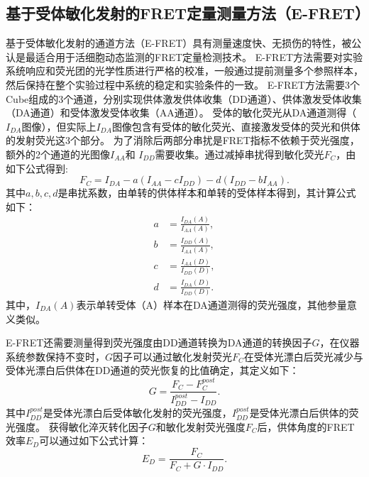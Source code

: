 \subsection{基于受体敏化发射的FRET定量测量方法（E-FRET）}

\ifshowtext
基于受体敏化发射的通道方法（E-FRET）具有测量速度快、无损伤的特性，被公认是最适合用于活细胞动态监测的FRET定量检测技术。
E-FRET方法需要对实验系统响应和荧光团的光学性质进行严格的校准，一般通过提前测量多个参照样本，然后保持在整个实验过程中系统的稳定和实验条件的一致。
E-FRET方法需要3个Cube组成的3个通道，分别实现供体激发供体收集（DD通道）、供体激发受体收集（DA通道）和受体激发受体收集（AA通道）。
受体的敏化荧光从DA通道测得（$I_{DA}$图像），但实际上$I_{DA}$图像包含有受体的敏化荧光、直接激发受体的荧光和供体的发射荧光这3个部分。
为了消除后两部分串扰是FRET指标不依赖于荧光强度，额外的2个通道的光图像$I_{AA}$和 $I_{DD}$需要收集。通过减掉串扰得到敏化荧光$F_C$，由如下公式得到:
\begin{equation}
F_C=I_{DA}-a(I_{AA}-cI_{DD})-d(I_{DD}-bI_{AA}).
\label{eq:fc}
\end{equation}
其中$a, b, c, d$是串扰系数，由单转的供体样本和单转的受体样本得到，其计算公式如下：
\begin{align}
a&=\frac{I_{DA}(A)}{I_{AA}(A)}, \label{eq:a}\\
b&=\frac{I_{DD}(A)}{I_{AA}(A)}, \label{eq:b}\\ 
c&=\frac{I_{AA}(D)}{I_{DD}(D)}, \label{eq:c}\\ 
d&=\frac{I_{DA}(D)}{I_{DD}(D)}. \label{eq:d}
\end{align}
其中，$I_{DA}(A)$表示单转受体（A）样本在DA通道测得的荧光强度，其他参量意义类似。

E-FRET还需要测量得到荧光强度由DD通道转换为DA通道的转换因子$G$，在仪器系统参数保持不变时，$G$因子可以通过敏化发射荧光$F_C$在受体光漂白后荧光减少与受体光漂白后供体在DD通道的荧光恢复的比值确定，其定义如下：
\begin{equation}
    G=\frac{F_C-F_C^{post}}{I_{DD}^{post}-I_{DD}}.
    \label{eq:g}
\end{equation}
其中$I_{DD}^{post}$是受体光漂白后受体敏化发射的荧光强度，$I_{DD}^{post}$是受体光漂白后供体的荧光强度。
获得敏化淬灭转化因子$G$和敏化发射荧光强度$F_C$后，供体角度的FRET效率$E_D$可以通过如下公式计算：
\begin{equation}
    E_D=\frac{F_C}{F_C+G \cdot I_{DD}}.
    \label{eq:ed}
\end{equation}

